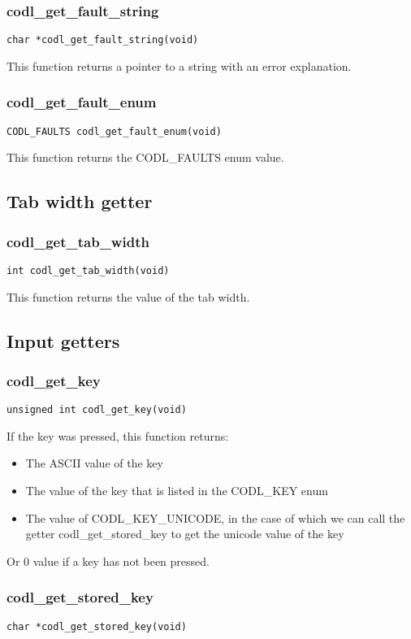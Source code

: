 \documentclass{article}
\newcommand{\fstep}{\vspace{3mm}\noindent}
\begin{document}
\subsubsection{codl\_get\_fault\_string}
{\tt char *codl\_get\_fault\_string(void)}

\fstep{} This function returns a pointer to a string with an error
explanation.

\subsubsection{codl\_get\_fault\_enum}
{\tt CODL\_FAULTS codl\_get\_fault\_enum(void)}

\fstep{} This function returns the CODL\_FAULTS enum value.

\subsection{Tab width getter}
\subsubsection{codl\_get\_tab\_width}

{\tt int codl\_get\_tab\_width(void)}

\fstep{} This function returns the value of the tab width.

\subsection{Input getters}

\subsubsection{codl\_get\_key}
{\tt unsigned int codl\_get\_key(void)}

\fstep{} If the key was pressed, this function returns:

\begin{itemize}
\item{The ASCII value of the key}
\item{The value of the key that is listed in the CODL\_KEY enum}
\item{The value of CODL\_KEY\_UNICODE, in the case of which we can call the
  getter codl\_get\_stored\_key to get the unicode value of the key}
\end{itemize}

Or 0 value if a key has not been pressed.

\subsubsection{codl\_get\_stored\_key}
{\tt char *codl\_get\_stored\_key(void)}
\end{document}
